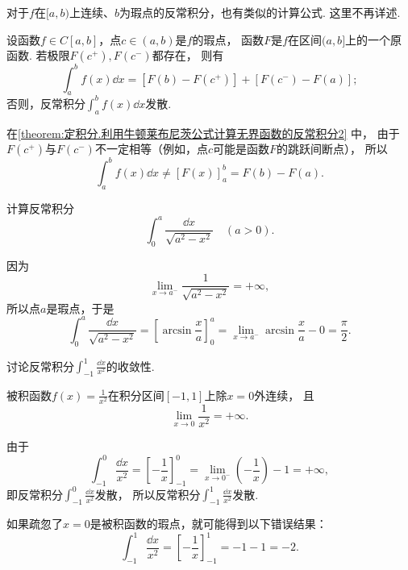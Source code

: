 对于\(f\)在\([a,b)\)上连续、\(b\)为瑕点的反常积分，也有类似的计算公式.
这里不再详述.

\begin{theorem}\label{theorem:定积分.利用牛顿莱布尼茨公式计算无界函数的反常积分2}
设函数\(f \in C[a,b]\)，点\(c\in(a,b)\)是\(f\)的瑕点，
函数\(F\)是\(f\)在区间\((a,b]\)上的一个原函数.
若极限\(F(c^+),F(c^-)\)都存在，
则有
\begin{equation}\label{equation:定积分.利用牛顿莱布尼茨公式计算无界函数的反常积分2}
	\int_a^b f(x) \dd{x}
	= [F(b) - F(c^+)] + [F(c^-) - F(a)];
\end{equation}
否则，反常积分\(\int_a^b f(x) \dd{x}\)发散.
\end{theorem}
在\cref{theorem:定积分.利用牛顿莱布尼茨公式计算无界函数的反常积分2} 中，
由于\(F(c^+)\)与\(F(c^-)\)不一定相等（例如，点\(c\)可能是函数\(F\)的跳跃间断点），
所以\begin{equation*}
	\int_a^b f(x) \dd{x}
	\neq [F(x)]_a^b = F(b) - F(a).
\end{equation*}

\begin{example}
计算反常积分\begin{equation*}
	\int_0^a \frac{\dd{x}}{\sqrt{a^2-x^2}}
	\quad(a>0).
\end{equation*}
\begin{solution}
因为\begin{equation*}
	\lim_{x \to a^-} \frac{1}{\sqrt{a^2-x^2}} = +\infty,
\end{equation*}
所以点\(a\)是瑕点，于是\begin{equation*}
	\int_0^a \frac{\dd{x}}{\sqrt{a^2-x^2}}
	= \left[ \arcsin\frac{x}{a} \right]_0^a
	= \lim_{x \to a^-} \arcsin\frac{x}{a} - 0 = \frac{\pi}{2}.
\end{equation*}
\end{solution}
\end{example}

\begin{example}
讨论反常积分\(\int_{-1}^1 \frac{\dd{x}}{x^2}\)的收敛性.
\begin{solution}
被积函数\(f(x) = \frac{1}{x^2}\)在积分区间\([-1,1]\)上除\(x=0\)外连续，
且\begin{equation*}
	\lim_{x\to0} \frac{1}{x^2} = +\infty.
\end{equation*}

由于\begin{equation*}
	\int_{-1}^0 \frac{\dd{x}}{x^2}
	= \left[-\frac{1}{x}\right]_{-1}^0
	= \lim_{x\to0^-} \left(-\frac{1}{x}\right) - 1
	= +\infty,
\end{equation*}
即反常积分\(\int_{-1}^0 \frac{\dd{x}}{x^2}\)发散，
所以反常积分\(\int_{-1}^1 \frac{\dd{x}}{x^2}\)发散.
\end{solution}
\end{example}
\begin{remark}
如果疏忽了\(x=0\)是被积函数的瑕点，就可能得到以下错误结果：\begin{equation*}
	\int_{-1}^1 \frac{\dd{x}}{x^2}
	= \left[ -\frac{1}{x} \right]_{-1}^1
	= -1 - 1 = -2.
\end{equation*}
\end{remark}

